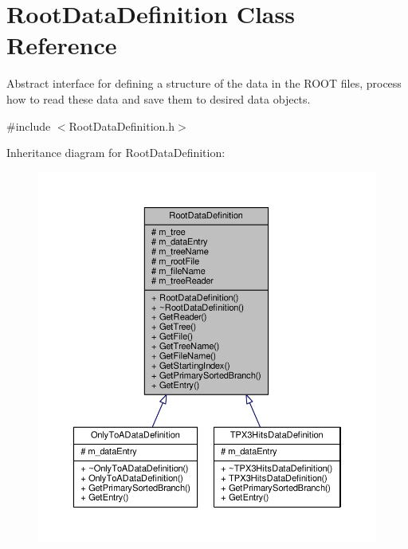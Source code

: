 \hypertarget{classRootDataDefinition}{\section{Root\+Data\+Definition Class Reference}
\label{classRootDataDefinition}
}


Abstract interface for defining a structure of the data in the R\+O\+O\+T files, process how to read these data and save them to desired data objects.  




{\ttfamily \#include $<$Root\+Data\+Definition.\+h$>$}



Inheritance diagram for Root\+Data\+Definition\+:
\nopagebreak
\begin{figure}[H]
\begin{center}
\leavevmode
\includegraphics[width=350pt]{classRootDataDefinition__inherit__graph}
\end{center}
\end{figure}


